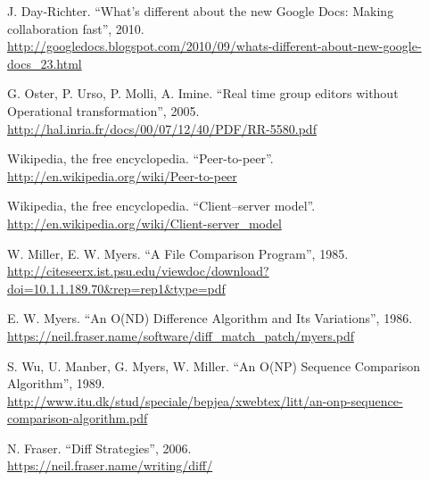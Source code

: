 \documentclass[a4paper, 12pt, twoside]{book}
\begin{document}
\begin{thebibliography}{99}
 J. Day-Richter. “What’s different about the new Google Docs: Making collaboration fast”, 2010.
\\\url{http://googledocs.blogspot.com/2010/09/whats-different-about-new-google-docs_23.html}

 G. Oster, P. Urso, P. Molli, A. Imine. “Real time group editors without Operational transformation”, 2005.
\\\url{http://hal.inria.fr/docs/00/07/12/40/PDF/RR-5580.pdf}

 Wikipedia, the free encyclopedia. “Peer-to-peer”.
\\\url{http://en.wikipedia.org/wiki/Peer-to-peer}

 Wikipedia, the free encyclopedia. “Client–server model”.
\\\url{http://en.wikipedia.org/wiki/Client-server_model}

 W. Miller, E. W. Myers. “A File Comparison Program”, 1985.
\\\url{http://citeseerx.ist.psu.edu/viewdoc/download?doi=10.1.1.189.70&rep=rep1&type=pdf}

 E. W. Myers. “An O(ND) Difference Algorithm and Its Variations”, 1986.
\\\url{https://neil.fraser.name/software/diff_match_patch/myers.pdf}

 S. Wu, U. Manber, G. Myers, W. Miller. “An O(NP) Sequence Comparison Algorithm”, 1989.
\\\url{http://www.itu.dk/stud/speciale/bepjea/xwebtex/litt/an-onp-sequence-comparison-algorithm.pdf}

 N. Fraser. “Diff Strategies”, 2006.
\\\url{https://neil.fraser.name/writing/diff/}

\end{thebibliography}

\end{document}
